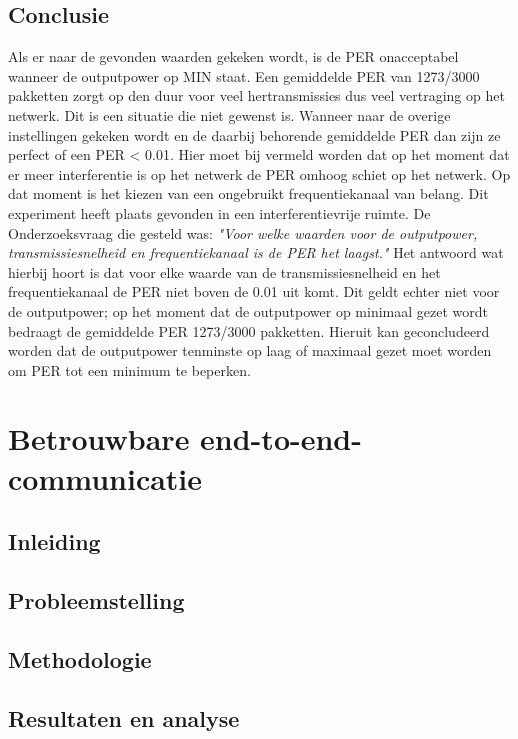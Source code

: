 \documentclass{article}
\begin{document}
\subsection{Conclusie}
Als er naar de gevonden waarden gekeken wordt, is de PER onacceptabel wanneer de outputpower op MIN staat. Een gemiddelde PER van 1273/3000 pakketten zorgt op den duur voor veel hertransmissies dus veel vertraging op het netwerk. Dit is een situatie die niet gewenst is. Wanneer naar de overige instellingen gekeken wordt en de daarbij behorende gemiddelde PER dan zijn ze perfect of een PER < 0.01. Hier moet bij vermeld worden dat op het moment dat er meer interferentie is op het netwerk de PER omhoog schiet op het netwerk. Op dat moment is het kiezen van een ongebruikt frequentiekanaal van belang. Dit experiment heeft plaats gevonden in een interferentievrije ruimte.
De Onderzoeksvraag die gesteld was: \textit{"Voor welke waarden voor de outputpower, transmissiesnelheid en frequentiekanaal is de PER het laagst."} Het antwoord wat hierbij hoort is dat voor elke waarde van de transmissiesnelheid en het frequentiekanaal de PER niet boven de 0.01 uit komt. Dit geldt echter niet voor de outputpower; op het moment dat de outputpower op minimaal gezet wordt bedraagt de gemiddelde PER 1273/3000 pakketten. Hieruit kan geconcludeerd worden dat de outputpower tenminste op laag of maximaal gezet moet worden om PER tot een minimum te beperken. 

\newpage

\clearpage
\section{Betrouwbare end-to-end-communicatie}
\subsection{Inleiding}
\subsection{Probleemstelling}
\subsection{Methodologie}
\subsection{Resultaten en analyse}
\clearpage
\appendix
\end{document}
